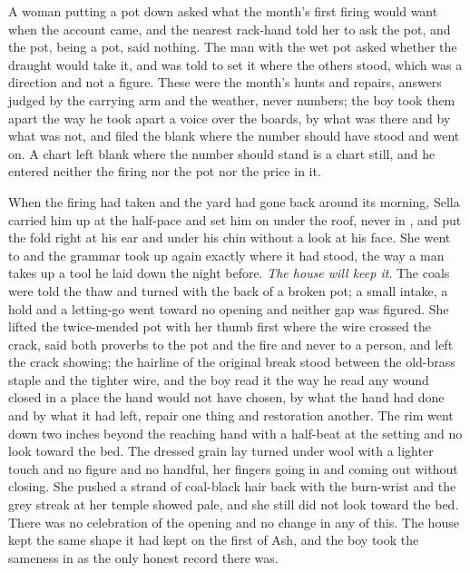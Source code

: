 A woman putting a pot down asked what the month's first firing would want when the account came, and the nearest rack-hand told her to ask the pot, and the pot, being a pot, said nothing. The man with the wet pot asked whether the draught would take it, and was told to set it where the others stood, which was a direction and not a figure. These were the month's hunts and repairs, answers judged by the carrying arm and the weather, never numbers; the boy took them apart the way he took apart a voice over the boards, by what was there and by what was not, and filed the blank where the number should have stood and went on. A chart left blank where the number should stand is a chart still, and he entered neither the firing nor the pot nor the price in it.

When the firing had taken and the yard had gone back around its morning, Sella carried him up at the half-pace and set him on  under the roof, never in , and put the fold right at his ear and under his chin without a look at his face. She went to  and the grammar took up again exactly where it had stood, the way a man takes up a tool he laid down the night before. \emph{The house will keep it}. The coals were told the thaw and turned with the back of a broken pot; a small intake, a hold and a letting-go went toward no opening and neither gap was figured. She lifted the twice-mended pot with her thumb first where the wire crossed the crack, said both proverbs to the pot and the fire and never to a person, and left the crack showing; the hairline of the original break stood between the old-brass staple and the tighter wire, and the boy read it the way he read any wound closed in a place the hand would not have chosen, by what the hand had done and by what it had left, repair one thing and restoration another. The rim went down two inches beyond the reaching hand with a half-beat at the setting and no look toward the bed. The dressed grain lay turned under wool with a lighter touch and no figure and no handful, her fingers going in and coming out without closing. She pushed a strand of coal-black hair back with the burn-wrist and the grey streak at her temple showed pale, and she still did not look toward the bed. There was no celebration of the opening and no change in any of this. The house kept the same shape it had kept on the first of Ash, and the boy took the sameness in as the only honest record there was.

